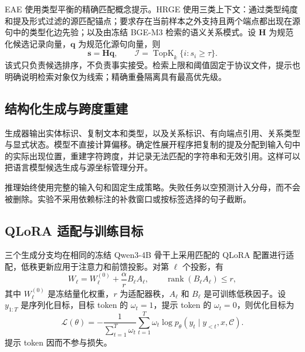 \documentclass[UTF8,a4paper,twocolumn,10pt]{ctexart}
\begin{document}
EAE 使用类型平衡的精确匹配概念提示。HRGE 使用三类上下文：通过类型纯度和提及形式过滤的源匹配锚点；要求存在当前样本之外支持且两个端点都出现在源句中的类型化边先验；以及由冻结 BGE-M3 检索的语义关系模式。设 $\mathbf H$ 为规范化候选记录向量，$\mathbf q$ 为规范化源句向量，则
\begin{equation}
\mathbf{s}=\mathbf{H}\mathbf{q},\qquad
\mathcal I=\operatorname{TopK}_{k}\{i:s_i\geq\tau\}.
\label{zh:eq:retrieval}
\end{equation}
该式只负责候选排序，不负责事实接受。检索上限和阈值固定于协议文件，提示也明确说明检索对象仅为线索；精确重叠隔离具有最高优先级。

\subsection{结构化生成与跨度重建}
生成器输出实体标识、复制文本和类型，以及关系标识、有向端点引用、关系类型与显式状态。模型不直接计算偏移。确定性展开程序把复制的提及分配到输入句中的实际出现位置，重建字符跨度，并记录无法匹配的字符串和无效引用。这样可以把语言模型候选生成与源坐标管理分开。

推理始终使用完整的输入句和固定生成策略。失败任务以空预测计入分母，而不会被删除。实验不采用依赖标注的补救窗口或按标签选择的句子截断。

\subsection{QLoRA 适配与训练目标}
三个生成分支均在相同的冻结 Qwen3-4B 骨干上采用匹配的 QLoRA 配置进行适配，低秩更新应用于注意力和前馈投影。对第 $\ell$ 个投影，有
\begin{equation}
W_{\ell}=W_{\ell}^{(0)}+\frac{\alpha}{r}B_{\ell}A_{\ell},
\qquad \operatorname{rank}(B_{\ell}A_{\ell})\leq r,
\label{zh:eq:qlora}
\end{equation}
其中 $W_{\ell}^{(0)}$ 是冻结量化权重，$r$ 为适配器秩，$A_{\ell}$ 和 $B_{\ell}$ 是可训练低秩因子。设 $y_{1:T}$ 是序列化目标，目标 token 的 $\omega_t=1$，提示 token 的 $\omega_t=0$，则优化目标为
\begin{equation}
\mathcal L(\theta)
=-\frac{1}{\sum_{t=1}^{T}\omega_t}
\sum_{t=1}^{T}\omega_t
\log p_{\theta}(y_t\mid y_{<t},x,\mathcal C).
\label{zh:eq:objective}
\end{equation}
提示 token 因而不参与损失。
\end{document}
